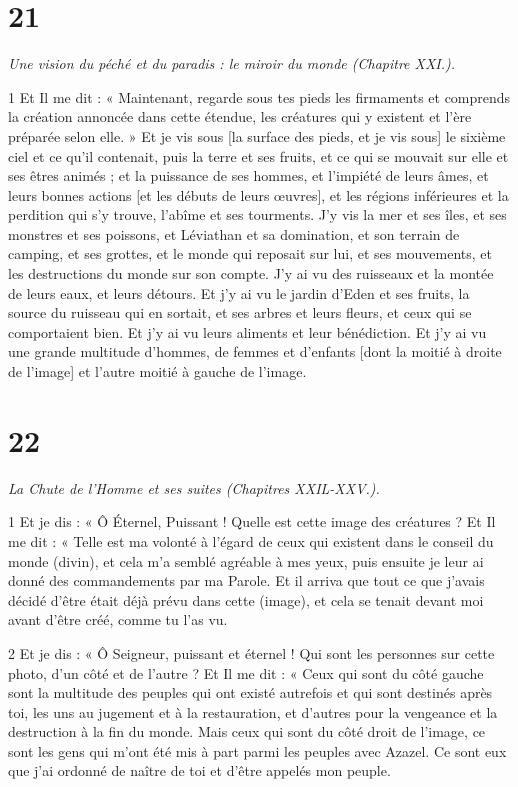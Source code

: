 \chapter{21}

\par \textit{Une vision du péché et du paradis : le miroir du monde (Chapitre XXI.).}

\par 1 Et Il me dit : « Maintenant, regarde sous tes pieds les firmaments et comprends la création annoncée dans cette étendue, les créatures qui y existent et l'ère préparée selon elle. » Et je vis sous [la surface des pieds, et je vis sous] le sixième ciel et ce qu'il contenait, puis la terre et ses fruits, et ce qui se mouvait sur elle et ses êtres animés ; et la puissance de ses hommes, et l'impiété de leurs âmes, et leurs bonnes actions [et les débuts de leurs œuvres], et les régions inférieures et la perdition qui s'y trouve, l'abîme et ses tourments. J'y vis la mer et ses îles, et ses monstres et ses poissons, et Léviathan et sa domination, et son terrain de camping, et ses grottes, et le monde qui reposait sur lui, et ses mouvements, et les destructions du monde sur son compte. J'y ai vu des ruisseaux et la montée de leurs eaux, et leurs détours. Et j'y ai vu le jardin d'Eden et ses fruits, la source du ruisseau qui en sortait, et ses arbres et leurs fleurs, et ceux qui se comportaient bien. Et j'y ai vu leurs aliments et leur bénédiction. Et j'y ai vu une grande multitude d'hommes, de femmes et d'enfants [dont la moitié à droite de l'image] et l'autre moitié à gauche de l'image.

\chapter{22}

\par \textit{La Chute de l'Homme et ses suites (Chapitres XXIL-XXV.).}

\par 1 Et je dis : « Ô Éternel, Puissant ! Quelle est cette image des créatures ? Et Il me dit : « Telle est ma volonté à l'égard de ceux qui existent dans le conseil du monde (divin), et cela m'a semblé agréable à mes yeux, puis ensuite je leur ai donné des commandements par ma Parole. Et il arriva que tout ce que j'avais décidé d'être était déjà prévu dans cette (image), et cela se tenait devant moi avant d'être créé, comme tu l'as vu.

\par 2 Et je dis : « Ô Seigneur, puissant et éternel ! Qui sont les personnes sur cette photo, d’un côté et de l’autre ? Et Il me dit : « Ceux qui sont du côté gauche sont la multitude des peuples qui ont existé autrefois et qui sont destinés après toi, les uns au jugement et à la restauration, et d'autres pour la vengeance et la destruction à la fin du monde. Mais ceux qui sont du côté droit de l’image, ce sont les gens qui m’ont été mis à part parmi les peuples avec Azazel. Ce sont eux que j’ai ordonné de naître de toi et d’être appelés mon peuple.

